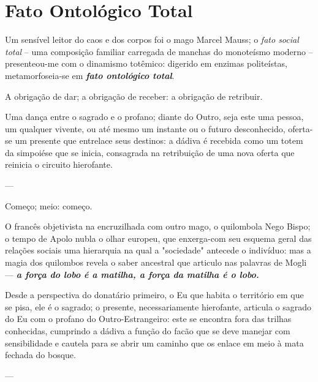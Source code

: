 \section{Fato Ontológico Total}


Um sensível leitor do caos e dos corpos foi o mago Marcel Mauss;
    o \textit{fato social total} -- uma composição familiar carregada de manchas do monoteísmo moderno -- presenteou-me com o dinamismo totêmico:
        digerido em enzimas politeístas, metamorfoseia-se em \textbf{\textit{fato ontológico total}}.

A obrigação de dar;
    a obrigação de receber:
        a obrigação de retribuir.

Uma dança entre o sagrado e o profano;
    diante do Outro, seja este uma pessoa, um qualquer vivente, ou até mesmo um instante ou o futuro desconhecido, oferta-se um presente que entrelace seus destinos:
        a dádiva é recebida como um totem da simpoiése que se inicia, consagrada na retribuição de uma nova oferta que reinicia o circuito hierofante.

---

Começo;
    meio:
        começo.

O francês objetivista na encruzilhada com outro mago, o quilombola Nego Bispo;
    o tempo de Apolo nubla o olhar europeu, que enxerga-com seu esquema geral das relações sociais uma hierarquia na qual a "sociedade" antecede o indivíduo:
        mas a magia dos quilombos revela o saber ancestral que articulo nas palavras de Mogli --- \textbf{\textit{a força do lobo é a matilha, a força da matilha é o lobo.}}

Desde a perspectiva do donatário primeiro, o Eu que habita o território em que se pisa, ele é o sagrado;
    o presente, necessariamente hierofante, articula o sagrado do Eu com o profano do Outro-Estrangeiro:
        este se encontra fora das trilhas conhecidas, cumprindo a dádiva a função do facão que se deve manejar com sensibilidade e cautela para se abrir um caminho que os enlace em meio à mata fechada do bosque.

---
